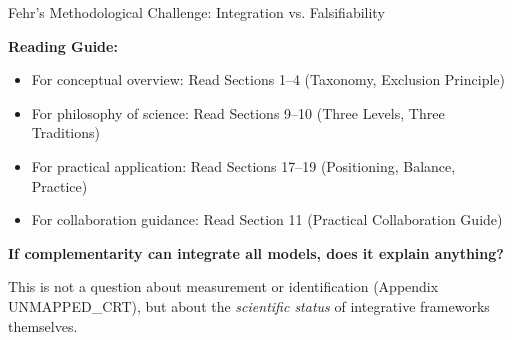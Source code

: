 \begin{chapter}{Fehr's Methodological Challenge: Integration vs. Falsifiability}
\begin{tcolorbox}[colback=purple!5!white, colframe=purple!75!black,
    title=Chapter Linkage]
\textbf{Reading Guide:}
\begin{itemize}[nosep]
\item For conceptual overview: Read Sections 1--4 (Taxonomy, Exclusion Principle)
\item For philosophy of science: Read Sections 9--10 (Three Levels, Three Traditions)
\item For practical application: Read Sections 17--19 (Positioning, Balance, Practice)
\item For collaboration guidance: Read Section 11 (Practical Collaboration Guide)
\end{itemize}

\end{tcolorbox}

\begin{abstract}
This appendix formalizes a meta-level critique of complementarity frameworks that is implicit in Ernst Fehr's methodological position but rarely stated explicitly: \textbf{the tension between model integration and scientific falsifiability}. Unlike the ten canonical arguments (Appendix UNMAPPED_CRT), which concern measurement, identification, or complexity, Fehr's deeper concern is epistemological: if a framework can integrate all models, it loses the disciplinary power that makes models scientific. This appendix (1) reconstructs Fehr's position from his methodological commitments, (2) shows how complementarity ($\gamma$) can either confirm or refute this concern depending on its use, and (3) proposes a resolution: $\gamma$ as an \textit{exclusion principle}, not an integration principle. The central claim: complementarity is scientifically legitimate precisely when it tells us what is \textit{not} complementary.
\end{abstract}

\begin{tcolorbox}[colback=red!5!white,colframe=red!75!black,title=\textbf{The Fundamental Question}]
\begin{center}
\large
\textbf{If complementarity can integrate all models, does it explain anything?}
\end{center}

\vspace{0.5em}
This is not a question about measurement or identification (Appendix UNMAPPED_CRT), but about the \textit{scientific status} of integrative frameworks themselves.
\end{tcolorbox}


\end{chapter}
